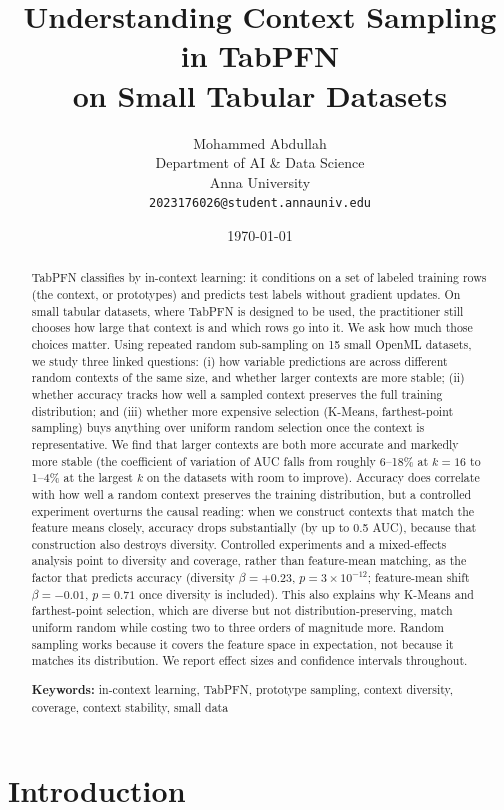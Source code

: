 \documentclass[11pt,a4paper]{article}
\title{Understanding Context Sampling in TabPFN\\ on Small Tabular Datasets}
\author{
  Mohammed Abdullah\\
  Department of AI \& Data Science\\
  Anna University\\
  \texttt{2023176026@student.annauniv.edu}
}
\date{\today}
\begin{document}
\maketitle

\begin{abstract}
TabPFN classifies by in-context learning: it conditions on a set of labeled
training rows (the context, or prototypes) and predicts test labels without
gradient updates. On small tabular datasets, where TabPFN is designed to be
used, the practitioner still chooses how large that context is and which rows
go into it. We ask how much those choices matter. Using repeated random
sub-sampling on 15 small OpenML datasets, we study three linked questions:
(i) how variable predictions are across different random contexts of the same
size, and whether larger contexts are more stable; (ii) whether accuracy tracks
how well a sampled context preserves the full training distribution; and
(iii) whether more expensive selection (K-Means, farthest-point sampling) buys
anything over uniform random selection once the context is representative.
We find that larger contexts are both more accurate and markedly more stable
(the coefficient of variation of AUC falls from roughly 6--18\% at $k{=}16$ to
1--4\% at the largest $k$ on the datasets with room to improve). Accuracy does
correlate with how well a random context preserves the training distribution,
but a controlled experiment overturns the causal reading: when we construct
contexts that match the feature means closely, accuracy drops substantially (by
up to 0.5 AUC), because that construction also destroys diversity. Controlled
experiments and a mixed-effects analysis point to diversity and coverage, rather
than feature-mean matching, as the factor that predicts accuracy (diversity
$\beta=+0.23$, $p=3\times10^{-12}$; feature-mean shift $\beta=-0.01$, $p=0.71$
once diversity is included). This also explains why K-Means and farthest-point
selection, which are diverse but not distribution-preserving, match uniform
random while costing two to three orders of magnitude more. Random sampling works because it
covers the feature space in expectation, not because it matches its
distribution. We report effect sizes and confidence intervals throughout.

\textbf{Keywords:} in-context learning, TabPFN, prototype sampling, context
diversity, coverage, context stability, small data
\end{abstract}

\section{Introduction}
\end{document}
